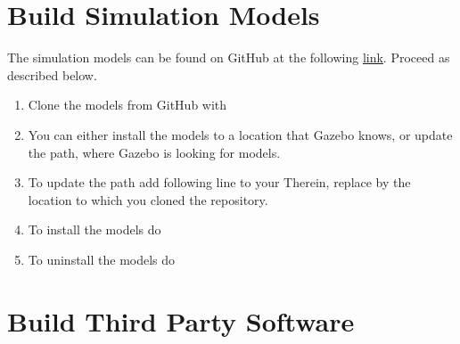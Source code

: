 \section{Build Simulation Models}
\label{sec::A4_sm}
The simulation models can be found on GitHub at the following \href{https://github.com/mhubii/gazebo_models/}{link}. Proceed as described below.
\begin{enumerate}
	\item Clone the models from GitHub with
	\newline {}
	\item You can either install the models to a location that Gazebo knows, or update the path, where Gazebo is looking for models.
	\item To update the path add following line to your 
	\newline {}
	\newline Therein, replace \inlinecode{}{<>} by the location to which you cloned the repository.
	\item To install the models do
	\newline {}
	\newline {}
	\newline {}
	\item To uninstall the models do
	\newline {}
	\newline {}
\end{enumerate}
\section{Build Third Party Software}
\label{sec::A5_tp}
